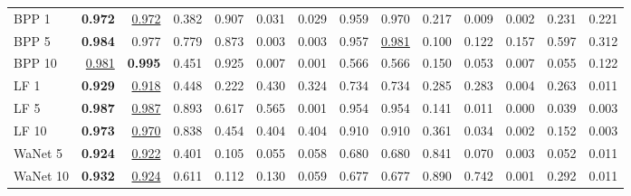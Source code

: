 \begin{table}[htbp]
\begin{adjustbox}{max width=\linewidth}
\begin{tabular}{lrrrrrrrrrrrrr}
BPP 1 & \textbf{0.972} & \underline{0.972} & \textcolor{black!45}{0.382} & 0.907 & \textcolor{black!45}{0.031} & \textcolor{black!45}{0.029} & 0.959 & 0.970 & \textcolor{black!45}{0.217} & \textcolor{black!45}{0.009} & \textcolor{black!45}{0.002} & \textcolor{black!45}{0.231} & \textcolor{black!45}{0.221} \\
BPP 5 & \textbf{0.984} & 0.977 & 0.779 & 0.873 & \textcolor{black!45}{0.003} & \textcolor{black!45}{0.003} & 0.957 & \underline{0.981} & \textcolor{black!45}{0.100} & \textcolor{black!45}{0.122} & \textcolor{black!45}{0.157} & 0.597 & \textcolor{black!45}{0.312} \\
BPP 10 & \underline{0.981} & \textbf{0.995} & \textcolor{black!45}{0.451} & 0.925 & \textcolor{black!45}{0.007} & \textcolor{black!45}{0.001} & 0.566 & 0.566 & \textcolor{black!45}{0.150} & \textcolor{black!45}{0.053} & \textcolor{black!45}{0.007} & \textcolor{black!45}{0.055} & \textcolor{black!45}{0.122} \\
LF 1 & \textbf{0.929} & \underline{0.918} & \textcolor{black!45}{0.448} & \textcolor{black!45}{0.222} & \textcolor{black!45}{0.430} & \textcolor{black!45}{0.324} & 0.734 & 0.734 & \textcolor{black!45}{0.285} & \textcolor{black!45}{0.283} & \textcolor{black!45}{0.004} & \textcolor{black!45}{0.263} & \textcolor{black!45}{0.011} \\
LF 5 & \textbf{0.987} & \underline{0.987} & 0.893 & 0.617 & 0.565 & \textcolor{black!45}{0.001} & 0.954 & 0.954 & \textcolor{black!45}{0.141} & \textcolor{black!45}{0.011} & \textcolor{black!45}{0.000} & \textcolor{black!45}{0.039} & \textcolor{black!45}{0.003} \\
LF 10 & \textbf{0.973} & \underline{0.970} & 0.838 & \textcolor{black!45}{0.454} & \textcolor{black!45}{0.404} & \textcolor{black!45}{0.404} & 0.910 & 0.910 & \textcolor{black!45}{0.361} & \textcolor{black!45}{0.034} & \textcolor{black!45}{0.002} & \textcolor{black!45}{0.152} & \textcolor{black!45}{0.003} \\
WaNet 5 & \textbf{0.924} & \underline{0.922} & \textcolor{black!45}{0.401} & \textcolor{black!45}{0.105} & \textcolor{black!45}{0.055} & \textcolor{black!45}{0.058} & 0.680 & 0.680 & 0.841 & \textcolor{black!45}{0.070} & \textcolor{black!45}{0.003} & \textcolor{black!45}{0.052} & \textcolor{black!45}{0.011} \\
WaNet 10 & \textbf{0.932} & \underline{0.924} & 0.611 & \textcolor{black!45}{0.112} & \textcolor{black!45}{0.130} & \textcolor{black!45}{0.059} & 0.677 & 0.677 & 0.890 & 0.742 & \textcolor{black!45}{0.001} & \textcolor{black!45}{0.292} & \textcolor{black!45}{0.011} \\

\end{tabular}
\end{adjustbox}
\end{table}
